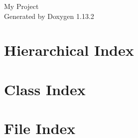 \documentclass[twoside]{book}
\newcommand{\+}{\discretionary{\mbox{\scriptsize$\hookleftarrow$}}{}{}}
\newcommand{\clearemptydoublepage}{%
    \newpage{\pagestyle{empty}\cleardoublepage}%
  }
\begin{document}
  \raggedbottom
    \hypersetup{pageanchor=false,
                bookmarksnumbered=true,
                pdfencoding=unicode
               }
  \begin{titlepage}
  \vspace*{7cm}
  \begin{center}%
  {\Large My Project}\\
  \vspace*{1cm}
  {\large Generated by Doxygen 1.13.2}\\
  \end{center}
  \end{titlepage}
  \clearemptydoublepage
  \tableofcontents
  \clearemptydoublepage
  \hypersetup{pageanchor=true}
\chapter{Hierarchical Index}

\chapter{Class Index}

\chapter{File Index}

\end{document}
